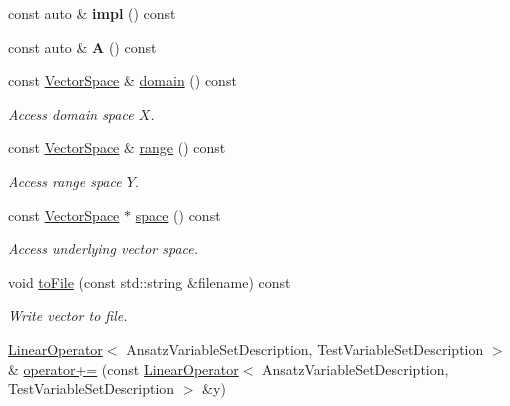 \begin{DoxyCompactItemize}
\item 
\hypertarget{classSpacy_1_1Kaskade_1_1LinearOperator_a282469235f3c65fdcfdf2573bd7be7a3}{}const auto \& {\bfseries impl} () const \label{classSpacy_1_1Kaskade_1_1LinearOperator_a282469235f3c65fdcfdf2573bd7be7a3}

\item 
\hypertarget{classSpacy_1_1Kaskade_1_1LinearOperator_abe2b88cb44e5f28c740dc886e3cc5c4f}{}const auto \& {\bfseries A} () const \label{classSpacy_1_1Kaskade_1_1LinearOperator_abe2b88cb44e5f28c740dc886e3cc5c4f}

\item 
const \hyperlink{classSpacy_1_1VectorSpace}{Vector\+Space} \& \hyperlink{classSpacy_1_1OperatorBase_a2588f9b3e0188820c4c494e63293dc6f_a2588f9b3e0188820c4c494e63293dc6f}{domain} () const 
\begin{DoxyCompactList}\small\item\em Access domain space $X$. \end{DoxyCompactList}\item 
const \hyperlink{classSpacy_1_1VectorSpace}{Vector\+Space} \& \hyperlink{classSpacy_1_1OperatorBase_ab19d3b7a6f290b1079248f1e567e53d6_ab19d3b7a6f290b1079248f1e567e53d6}{range} () const 
\begin{DoxyCompactList}\small\item\em Access range space $Y$. \end{DoxyCompactList}\item 
const \hyperlink{classSpacy_1_1VectorSpace}{Vector\+Space} $\ast$ \hyperlink{classSpacy_1_1VectorBase_a95e87ce98f5a7646055d4e87e6024044_a95e87ce98f5a7646055d4e87e6024044}{space} () const 
\begin{DoxyCompactList}\small\item\em Access underlying vector space. \end{DoxyCompactList}\item 
void \hyperlink{classSpacy_1_1VectorBase_afb1386a51c713d85ea2fc7a2cb41d04e_afb1386a51c713d85ea2fc7a2cb41d04e}{to\+File} (const std\+::string \&filename) const 
\begin{DoxyCompactList}\small\item\em Write vector to file. \end{DoxyCompactList}\item 
\hyperlink{classSpacy_1_1Kaskade_1_1LinearOperator}{Linear\+Operator}$<$ Ansatz\+Variable\+Set\+Description, Test\+Variable\+Set\+Description $>$ \& \hyperlink{classSpacy_1_1SupportedOperatorBase_a9d52829c0e1fcafab1f2a3de17379633_a9d52829c0e1fcafab1f2a3de17379633}{operator+=} (const \hyperlink{classSpacy_1_1Kaskade_1_1LinearOperator}{Linear\+Operator}$<$ Ansatz\+Variable\+Set\+Description, Test\+Variable\+Set\+Description $>$ \&y)

\end{DoxyCompactItemize}
